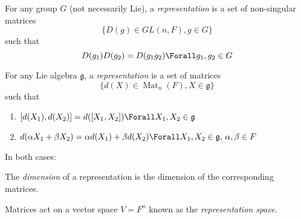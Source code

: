 \documentclass{jknotes}
\begin{document}
\begin{defn}
    For any group \(G\) (not necessarily Lie), a \emph{representation} is a set of non-singular matrices
    \begin{equation}
        \{D(g)\in GL(n,F), g \in G\}
    \end{equation}
    such that
    \begin{equation}
        D(g_1)D(g_2) = D(g_1g_2) \Forall g_1,g_2 \in G
    \end{equation}
\end{defn}
\begin{defn}
    For any Lie algebra \(\mathfrak{g}\), a \emph{representation} is a set of matrices
    \begin{equation}
        \{d(X)\in \operatorname{Mat}_n(F), X \in \mathfrak{g}\}
    \end{equation}
    such that
    \begin{enumerate}[label=(\roman*)]
        \item \([d(X_1),d(X_2)] = d([X_1,X_2]) \Forall X_1,X_2 \in \mathfrak{g}\)
        \item \(d(\alpha X_1 + \beta X_2) = \alpha d(X_1) + \beta d(X_2) \Forall X_1,X_2 \in \mathfrak{g},\, \alpha,\beta \in F\)
    \end{enumerate}
\end{defn}
In both cases:
\begin{defn}
    The \emph{dimension} of a representation is the dimension of the corresponding matrices.
\end{defn}
\begin{defn}
    Matrices act on a vector space \(V=F^n\) known as the \emph{representation space}.
\end{defn}
\end{document}
